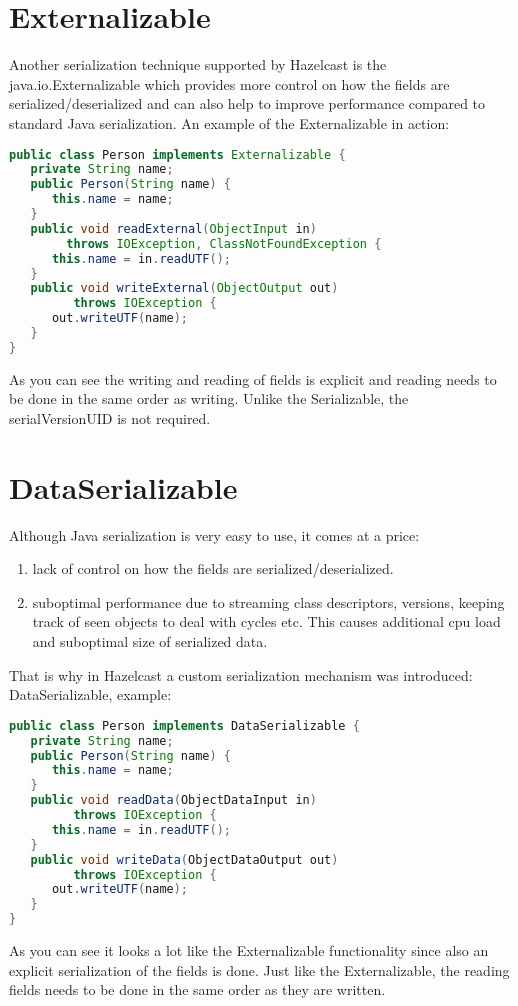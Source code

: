 \section{Externalizable}
Another serialization technique supported by Hazelcast is the java.io.Externalizable which provides more control on how the fields are serialized/deserialized and can also help to improve performance compared to standard Java serialization. An example of the Externalizable in action:
\begin{lstlisting}[language=java]
public class Person implements Externalizable {
   private String name;
   public Person(String name) {
      this.name = name;
   }
   public void readExternal(ObjectInput in) 
        throws IOException, ClassNotFoundException {
      this.name = in.readUTF();
   }
   public void writeExternal(ObjectOutput out) 
         throws IOException {
      out.writeUTF(name);
   }
}
\end{lstlisting}
As you can see the writing and reading of fields is explicit and reading needs to be done in the same order as writing. Unlike the Serializable, the serialVersionUID is not required.

\section{DataSerializable}
Although Java serialization is very easy to use, it comes at a price:
\begin{enumerate}
\item lack of control on how the fields are serialized/deserialized.
\item suboptimal performance due to streaming class descriptors, versions, keeping track of seen objects to deal with cycles etc. This causes additional cpu load and suboptimal size of serialized data.
\end{enumerate}
That is why in Hazelcast a custom serialization mechanism was introduced: DataSerializable, example:
\begin{lstlisting}[language=java]
public class Person implements DataSerializable {
   private String name;
   public Person(String name) {
      this.name = name;
   }
   public void readData(ObjectDataInput in) 
         throws IOException {
      this.name = in.readUTF();
   }
   public void writeData(ObjectDataOutput out) 
         throws IOException {
      out.writeUTF(name);
   }
}
\end{lstlisting}
As you can see it looks a lot like the Externalizable functionality since also an explicit serialization of the fields is done. Just like the Externalizable, the reading fields needs to be done in the same order as they are written.

